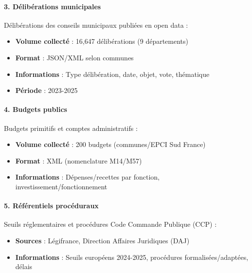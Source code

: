 \paragraph{3. Délibérations municipales}

Délibérations des conseils municipaux publiées en open data :

\begin{itemize}
    \item \textbf{Volume collecté} : 16,647 délibérations (9 départements)
    
    \item \textbf{Format} : JSON/XML selon communes
    
    \item \textbf{Informations} : Type délibération, date, objet, vote, thématique
    
    \item \textbf{Période} : 2023-2025
\end{itemize}

\paragraph{4. Budgets publics}

Budgets primitifs et comptes administratifs :

\begin{itemize}
    \item \textbf{Volume collecté} : 200 budgets (communes/EPCI Sud France)
    
    \item \textbf{Format} : XML (nomenclature M14/M57)
    
    \item \textbf{Informations} : Dépenses/recettes par fonction, investissement/fonctionnement
\end{itemize}

\paragraph{5. Référentiels procéduraux}

Seuils réglementaires et procédures Code Commande Publique (CCP) :

\begin{itemize}
    \item \textbf{Sources} : Légifrance, Direction Affaires Juridiques (DAJ)
    
    \item \textbf{Informations} : Seuils européens 2024-2025, procédures formalisées/adaptées, délais
\end{itemize}

